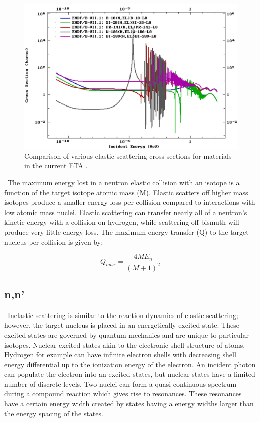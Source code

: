 \begin{figure}[ht]
	\includegraphics[width=\linewidth]{Figures/Chapter2/elastic.png}
	\caption[Comparison of various elastic scattering cross-sections for materials in the current ETA]{Comparison of various elastic scattering cross-sections for materials in the current ETA \cite{ENDF}.}
	\label{fig:elastic}
\end{figure}

\ The maximum energy lost in a neutron elastic collision with an isotope is a function of the target isotope atomic mass (M). 
Elastic scatters off higher mass isotopes produce a smaller energy loss per collision compared to interactions with low atomic mass nuclei. 
Elastic scattering can transfer nearly all of a neutron's kinetic energy with a collision on hydrogen, while scattering off bismuth will produce very little energy loss. 
The maximum energy transfer (Q) to the target nucleus per collision is given by: 

\begin{equation} \label{eq:elastic}
    Q_{max}=\dfrac{4ME_{n}}{(M+1)^{2}}
\end{equation}

\subsection{n,n'}

\ Inelastic scattering is similar to the reaction dynamics of elastic scattering; however, the target nucleus is placed in an energetically excited state\cite{Turner}.
These excited states are governed by quantum mechanics and are unique to particular isotopes. 
Nuclear excited states akin to the electronic shell structure of atoms. Hydrogen for example can have infinite electron shells with decreasing shell energy differential up to the ionization energy of the electron. An incident photon can populate the electron into an excited states, but nuclear states have a limited number of discrete levels. Two nuclei can form a quasi-continuous spectrum during a compound reaction which gives rise to resonances\cite{Krane}. These resonances have a certain energy width created by states having a energy widths larger than the energy spacing of the states. 


